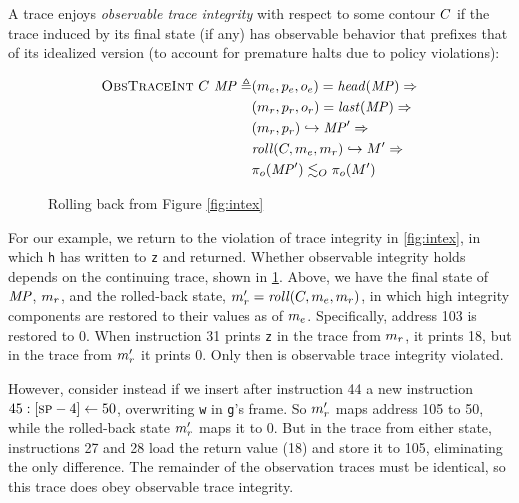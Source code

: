 \documentclass[acmsmall,review,anonymous]{acmart}\settopmatter{printfolios=true,printccs=false,printacmref=false}
\begin{document}

      A trace enjoys {\em observable trace integrity} with respect to
      some contour \(C\) if the trace induced by its final
      state (if any) has observable behavior that prefixes that of its
      idealized version (to account for premature halts due to policy
      violations):

      \[\begin{split}
        \text{\sc ObsTraceInt} ~ C ~ \mathit{MP} \triangleq
        & (m_e,p_e,o_e) = \mathit{head}(\mathit{MP}) \Rightarrow \\
        & (m_r,p_r,o_r) = \mathit{last}(\mathit{MP}) \Rightarrow \\
        & (m_r,p_r) \hookrightarrow \mathit{MP}' \Rightarrow \\
        & \mathit{roll}(C,m_e,m_r) \hookrightarrow M'
          \Rightarrow \\
        & \pi_o(\mathit{MP}') \lesssim_O \pi_o(M')
      \end{split}\]

    \begin{figure}
      \integritylazyexample
      \caption{Rolling back from Figure \ref{fig:intex}}
      \label{fig:intlex}
    \end{figure}

    For our example, we return to the violation of trace integrity in
    \cref{fig:intex}, in which {\tt h} has written to {\tt z} and returned.
    Whether observable integrity holds depends on the continuing trace, shown
    in \cref{fig:intlex}. Above, we have the final state of \(\mathit{MP}\),
    \(m_r\), and the rolled-back state, \(m_r' =
    \mathit{roll}(C,m_e,m_r)\), in which high integrity
    components are restored to their values as of \(m_e\). Specifically,
    address 103 is restored to 0. When instruction 31 prints {\tt z} in the
    trace from \(m_r\), it prints 18, but in the trace from \(m_r'\)
    it prints 0. Only then is observable trace integrity violated.

    However, consider instead if we insert after instruction 44 a new
    instruction \(45: [\textsc{sp}-4] \leftarrow 50\), overwriting {\tt w} in
    {\tt g}'s frame. So \(m_r'\) maps address 105 to 50, while the
    rolled-back state \(m_r'\) maps it to 0. But in the trace from either
    state, instructions 27 and 28 load the return value (18) and store it to
    105, eliminating the only difference. The remainder of the observation
    traces must be identical, so this trace does obey observable trace
    integrity.
\end{document}
